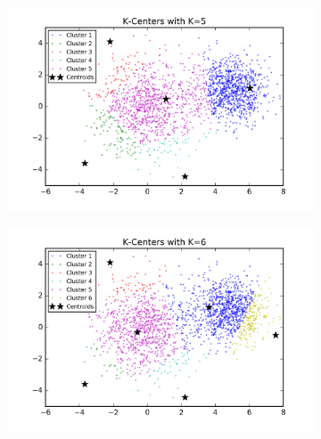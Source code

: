 \begin{description}
\begin{description}
\begin{figure}[!h]
\begin{subfigure}[b]{0.475\textwidth}
        \end{subfigure}
        \begin{subfigure}[b]{0.475\textwidth}  
            \centering 
            \includegraphics[width=\textwidth]{./figures/clustering_kCenter_5.png}
        \end{subfigure}
        \hfill
        \begin{subfigure}[b]{0.475\textwidth}   
            \centering 
            \includegraphics[width=\textwidth]{./figures/clustering_kCenter_6.png}
        \end{subfigure}
        \begin{subfigure}[b]{0.475\textwidth}   
            \centering 

\end{subfigure}
\end{figure}
\end{description}
\end{description}

